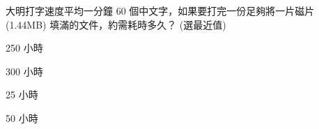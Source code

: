\ifx\ntpcNinetyThree\undefined[93學年基北區] \fi
大明打字速度平均一分鐘 60 個中文字，如果要打完一份足夠將一片磁片 (1.44MB) 填滿的文件，約需耗時多久？ (選最近值)
  \begin{optionlist}
  \item 250 小時\label{ntpc-93-a9}
  \item 300 小時
  \item 25 小時
  \item 50 小時
  \end{optionlist}